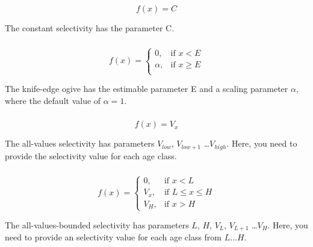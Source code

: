 \begin{equation}
f(x)=C
\end{equation}

The constant selectivity has the parameter C. 

\subsubsection[Knife-edge]{}
\begin{equation}
f(x)= \begin{cases}
  0, & \text{if $x < E$} \\
  \alpha, & \text{if $x \ge E$}\\ 
  \end{cases} 
\end{equation}

The knife-edge ogive has the estimable parameter E and a scaling parameter $\alpha$, where the default value of $\alpha = 1$.

\subsubsection[All-values]{}

\begin{equation}
f(x)=V_x
\end{equation}

The all-values selectivity has parameters $V_{low}$, $V_{low+1}$ \ldots $V_{high}$. Here, you need to provide the selectivity value for each age class.

\subsubsection[All-values-bounded]{}

\begin{equation}
f(x)=\begin{cases}
		 0, & \text{if $x < L$} \\
		 V_x, & \text{if $L \le x \le H$} \\
		 V_H, & \text{if $x > H$}
  \end{cases}
\end{equation}

The all-values-bounded selectivity has parameters  $L$, $H$, $V_L$, $V_{L+1}$ \ldots $V_H$. Here, you need to provide an selectivity value for each age class from $L \ldots H$.

